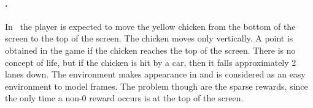 \paragraph{\freeway.} In \freeway\ the player is expected to move the yellow chicken from the bottom of the screen to the top of the screen.  The chicken moves only vertically. A point is obtained in the game if the chicken reaches the top of the screen. There is no concept of life, but if the chicken is hit by a car, then it falls approximately 2 lanes down. The environment makes appearance in \cite{recurrent} and is considered as an easy environment to model \cite[page 18]{recurrent} frames. The problem though are the sparse rewards, since the only time a non-0 reward occurs is at the top of the screen.  

